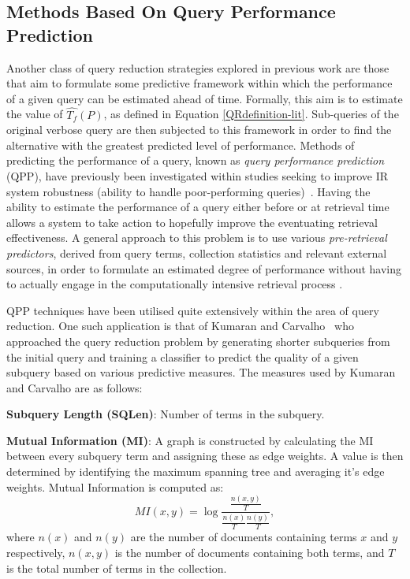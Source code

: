 \documentclass[a4paper]{report}
\begin{document}
\subsection{Methods Based On Query Performance Prediction}

Another class of query reduction strategies explored in previous work are those that aim to formulate some predictive framework within which the performance of a given query can be estimated ahead of time. Formally, this aim is to estimate the value of $\widehat{T_f}(P)$, as defined in Equation \ref{QRdefinition-lit}. Sub-queries of the original verbose query are then subjected to this framework in order to find the alternative with the greatest predicted level of performance. Methods of predicting the performance of a query, known as \textit{query performance prediction} (QPP), have previously been investigated within studies seeking to improve IR system robustness (ability to handle poor-performing queries)~\cite{HE2006585}. Having the ability to estimate the performance of a query either before or at retrieval time allows a system to take action to hopefully improve the eventuating retrieval effectiveness. A general approach to this problem is to use various \textit{pre-retrieval predictors}, derived from query terms, collection statistics and relevant external sources, in order to formulate an estimated degree of performance without having to actually engage in the computationally intensive retrieval process \cite{Hauff:2008:SPQ:1458082.1458311}. 

QPP techniques have been utilised quite extensively within the area of query reduction. One such application is that of Kumaran and Carvalho~\citep{Kumaran2009Reducing-Long-Q} who approached the query reduction problem by generating shorter subqueries from the initial query and training a classifier to predict the quality of a given subquery based on various predictive measures. The measures used by Kumaran and Carvalho are as follows:

\textbf{Subquery Length (SQLen)}:
Number of terms in the subquery.

\textbf{ Mutual Information (MI)}:
A graph is constructed by calculating the MI between every subquery term and assigning these as edge weights. A value is then determined by identifying the maximum spanning tree and averaging it's edge weights. Mutual Information is computed as:
$$MI(x,y) = \log \frac{\frac{n(x,y)}{T}}{\frac{n(x)}{T}\frac{n(y)}{T}},$$
where $n(x)$ and $n(y)$ are the number of documents containing terms $x$ and $y$ respectively, $n(x,y)$ is the number of documents containing both terms, and $T$ is the total number of terms in the collection.
\end{document}
